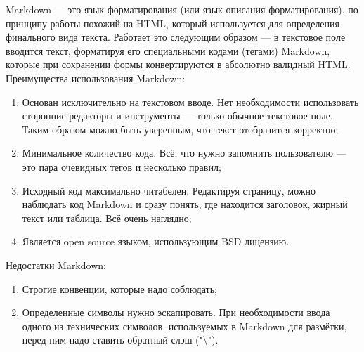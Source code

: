 Markdown — это язык форматирования (или язык описания форматирования), по принципу работы похожий на HTML, который используется для определения финального вида текста.
Работает это следующим образом — в текстовое поле вводится текст, форматируя его специальными кодами (тегами) Markdown, которые при сохранении формы конвертируются в абсолютно валидный HTML.
Преимущества использования Markdown:

\begin{enumerate}
  \item Основан исключительно на текстовом вводе. Нет необходимости использовать сторонние редакторы и инструменты — только обычное текстовое поле. Таким образом можно быть уверенным, что текст отобразится корректно;
  \item Минимальное количество кода. Всё, что нужно запомнить пользователю — это пара очевидных тегов и несколько правил;
  \item Исходный код максимально читабелен. Редактируя страницу, можно наблюдать код Markdown и сразу понять, где находится заголовок, жирный текст или таблица. Всё очень наглядно;
  \item Является open source языком, использующим BSD лицензию.
\end{enumerate}

Недостатки Markdown:

\begin{enumerate}
  \item Строгие конвенции, которые надо соблюдать;
  \item Определенные символы нужно эскапировать. При необходимости ввода одного из технических символов, используемых в Markdown для размётки, перед ним надо ставить обратный слэш ("\textbackslash").~\cite{markdown}
\end{enumerate}
